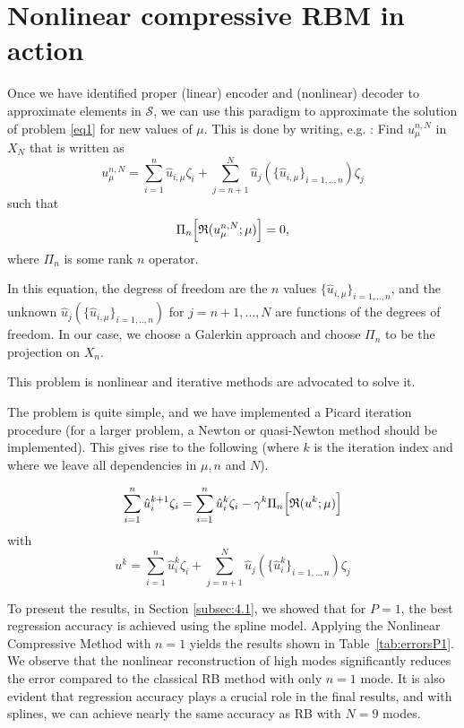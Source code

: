 \documentclass[graybox]{svmult}
\begin{document}
\section{Nonlinear compressive RBM in action}
\label{sec:5}
Once we have identified proper (linear) encoder and (nonlinear) decoder  to approximate elements in ${\mathcal S}$, we can use this paradigm to approximate the solution of problem \eqref{eq1} for new values of $\mu$. This is done by writing, e.g. : Find $u^{n,N}_\mu$
 in $X_N$ that is written as
\begin{equation}\label{eqCRBsol}
   u^{n,N}_\mu = \sum_{i=1}^n \hat u_{i,\mu} \zeta_i +  \sum_{j=n+1}^N  \hat u_{j}(\{\hat u_{i,\mu}\}_{i=1,..,n})
\zeta_j
\end{equation} such that
\begin{equation}\label{eqCRBeq}
  \Pi_n\Bigl[ {\mathfrak R}(u^{n,N}_\mu;\mu)\Bigr]=0,
\end{equation} 
where $\Pi_n$ is some rank $n$ operator. 

In this equation, the degress of freedom are the $n$ values $\{\hat u_{i,\mu}\}_{i=1,..,n}$, and the unknown $\hat u_{j}(\{\hat u_{i,\mu}\}_{i=1,..,n})$ for $j=n+1,\dots, N$ are functions of the degrees of freedom. In our case, we choose a Galerkin approach and choose $ \Pi_n$ to be the projection on $X_n$.

This problem is nonlinear and iterative methods are advocated to solve it.

The problem is quite simple, and we have implemented a Picard iteration procedure (for a larger problem, a Newton or quasi-Newton method should be implemented). This gives rise to the following (where $k$ is the iteration index and where we leave all dependencies in $\mu, n$ and $N$).

\begin{equation}
  \sum_{i=1}^n \hat u_{i}^{k+1} \zeta_i  =
  \sum_{i=1}^n \hat u_{i}^{k} \zeta_i
  - \gamma^k \Pi_n\Bigl[ {\mathfrak R}(u^k;\mu)\Bigr]
\end{equation}
with
\begin{equation}
     u^k = \sum_{i=1}^n \hat u_{i}^k \zeta_i +  \sum_{j=n+1}^N  \hat u_{j}(\{\hat u_{i}^k\}_{i=1,..,n})
\zeta_j
\end{equation}


To present the results, in Section \ref{subsec:4.1}, we showed that for $P=1$, the best regression accuracy is achieved using the spline model. Applying the Nonlinear Compressive Method with $n=1$ yields the results shown in Table~\ref{tab:errorsP1}. We observe that the nonlinear reconstruction of high modes significantly reduces the error compared to the classical RB method with only $n=1$ mode. It is also evident that regression accuracy plays a crucial role in the final results, and with splines, we can achieve nearly the same accuracy as RB with $N=9$ modes.
\end{document}
